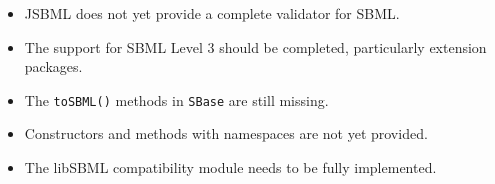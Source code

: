 \begin{itemize}
\item JSBML does not yet provide a complete validator for SBML.
\item The support for SBML Level 3 should be completed, particularly extension packages.
\item The \texttt{toSBML()}
methods in \texttt{SBase} are still missing.
\item Constructors and methods with namespaces are not yet provided.
\item The libSBML compatibility module needs
to be fully implemented.
\end{itemize}
